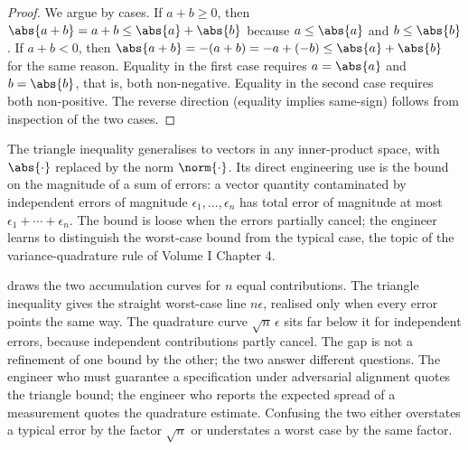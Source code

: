 \begin{proof}
We argue by cases. If $a + b \geq 0$, then $\abs{a + b} = a + b \leq
\abs{a} + \abs{b}$ because $a \leq \abs{a}$ and $b \leq \abs{b}$. If
$a + b < 0$, then $\abs{a + b} = -(a + b) = -a + (-b) \leq \abs{a} +
\abs{b}$ for the same reason. Equality in the first case requires
$a = \abs{a}$ and $b = \abs{b}$, that is, both non-negative.
Equality in the second case requires both non-positive. The reverse
direction (equality implies same-sign) follows from inspection of
the two cases.
\end{proof}

The triangle inequality generalises to vectors in any inner-product
space, with $\abs{\cdot}$ replaced by the norm $\norm{\cdot}$. Its
direct engineering use is the bound on the magnitude of a sum of
errors: a vector quantity contaminated by independent errors of
magnitude $\epsilon_{1}, \ldots, \epsilon_{n}$ has total error of
magnitude at most $\epsilon_{1} + \cdots + \epsilon_{n}$. The bound
is loose when the errors partially cancel; the engineer learns to
distinguish the worst-case bound from the typical case, the topic of
the variance-quadrature rule of Volume I Chapter 4.



 draws the two accumulation curves for
$n$ equal contributions. The triangle inequality gives the straight
worst-case line $n\epsilon$, realised only when every error points the
same way. The quadrature curve $\sqrt{n}\,\epsilon$ sits far below it for
independent errors, because independent contributions partly cancel. The
gap is not a refinement of one bound by the other; the two answer
different questions. The engineer who must guarantee a specification
under adversarial alignment quotes the triangle bound; the engineer who
reports the expected spread of a measurement quotes the quadrature
estimate. Confusing the two either overstates a typical error by the
factor $\sqrt{n}$ or understates a worst case by the same factor.

